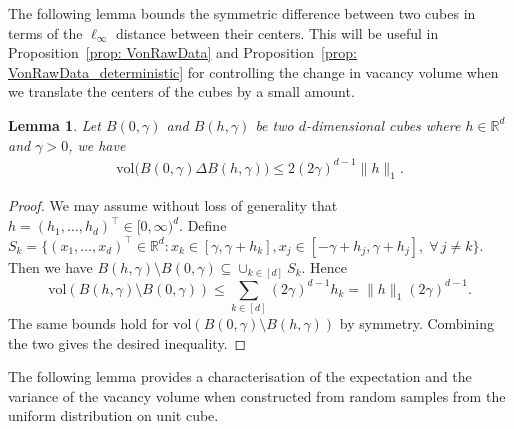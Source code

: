 \documentclass[11pt]{article}
\newtheorem{lemma}[thm]{Lemma}
\begin{document}
The following lemma bounds the symmetric difference between two cubes in terms of the $\ell_\infty$ distance between their centers. This will be useful in Proposition~\ref{prop: VonRawData} and Proposition~\ref{prop: VonRawData_deterministic} for controlling the change in vacancy volume when we translate the centers of the cubes by a small amount.

\begin{lemma}\label{lem: symdiff}
Let $B(0, \gamma)$ and $B(h, \gamma)$ be two $d$-dimensional cubes where $h \in \mathbb{R}^d$ and $\gamma >0 $, we have
\begin{align}
    \mathrm{vol}\bigl(B(0, \gamma) \Delta B(h, \gamma)\bigr) \leq 2(2\gamma)^{d-1} \|h\|_{1}. \label{ineq: symdiffbound}
\end{align}
\end{lemma}
\begin{proof}
We may assume without loss of generality that $h = (h_1,\ldots,h_d)^\top \in [0,\infty)^d$. Define $S_k = \{(x_1,\ldots,x_d)^\top\in \mathbb{R}^d: x_k \in [\gamma, \gamma + h_k],  x_j \in [-\gamma + h_j, \gamma + h_j],\; \forall\, j\neq k\}$. Then we have $B(h,\gamma)\setminus B(0,\gamma) \subseteq \cup_{k\in[d]} S_k$. Hence 
\[
\mathrm{vol}(B(h,\gamma) \setminus B(0,\gamma)) \leq \sum_{k\in[d]} (2\gamma)^{d-1}h_k = \|h\|_1 (2\gamma)^{d-1}.
\]
The same bounds hold for $\mathrm{vol}(B(0,\gamma)\setminus B(h,\gamma))$ by symmetry. Combining the two gives the desired inequality. 
\end{proof}

The following lemma provides a characterisation of the expectation and the variance of the vacancy volume when constructed from random samples from the uniform distribution on unit cube.
\end{document}
